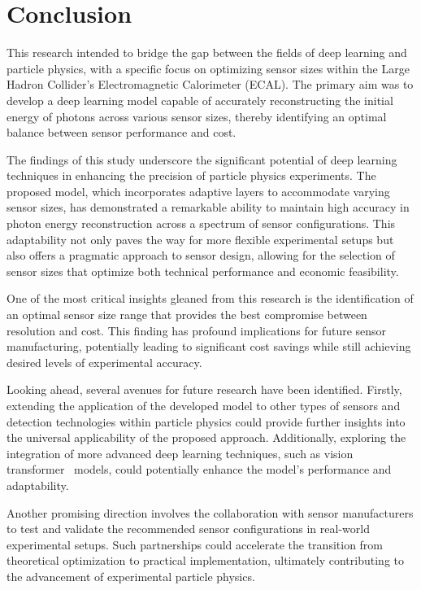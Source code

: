 \documentclass[conference]{IEEEtran}
\begin{document}
\section{Conclusion}
\label{conclusion}

This research intended to bridge the gap between the fields of deep learning and particle physics, with a specific focus on optimizing sensor sizes within the Large Hadron Collider's Electromagnetic Calorimeter (ECAL). The primary aim was to develop a deep learning model capable of accurately reconstructing the initial energy of photons across various sensor sizes, thereby identifying an optimal balance between sensor performance and cost.

The findings of this study underscore the significant potential of deep learning techniques in enhancing the precision of particle physics experiments. The proposed model, which incorporates adaptive layers to accommodate varying sensor sizes, has demonstrated a remarkable ability to maintain high accuracy in photon energy reconstruction across a spectrum of sensor configurations. This adaptability not only paves the way for more flexible experimental setups but also offers a pragmatic approach to sensor design, allowing for the selection of sensor sizes that optimize both technical performance and economic feasibility.

One of the most critical insights gleaned from this research is the identification of an optimal sensor size range that provides the best compromise between resolution and cost. This finding has profound implications for future sensor manufacturing, potentially leading to significant cost savings while still achieving desired levels of experimental accuracy.

Looking ahead, several avenues for future research have been identified. Firstly, extending the application of the developed model to other types of sensors and detection technologies within particle physics could provide further insights into the universal applicability of the proposed approach. Additionally, exploring the integration of more advanced deep learning techniques, such as vision transformer~\cite{dosovitskiy2021image} models, could potentially enhance the model's performance and adaptability.

Another promising direction involves the collaboration with sensor manufacturers to test and validate the recommended sensor configurations in real-world experimental setups. Such partnerships could accelerate the transition from theoretical optimization to practical implementation, ultimately contributing to the advancement of experimental particle physics.
\end{document}
